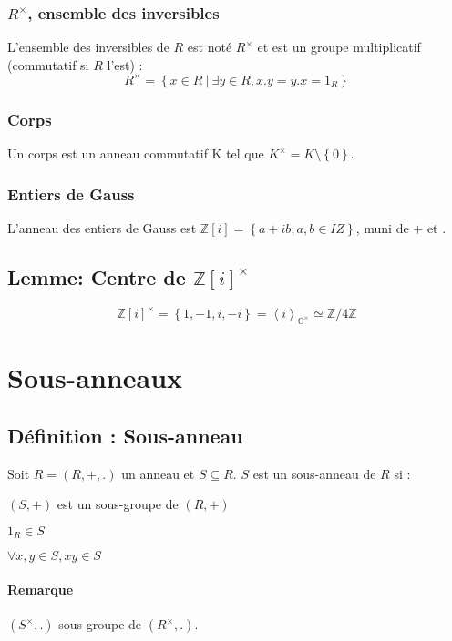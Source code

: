 \documentclass[reqno,a4paper,10pt]{report}
\makeatletter
\newcommand{\gen}[1]{\left\langle #1 \right\rangle} %
\newcommand{\set}[1]{\left\lbrace #1 \right\rbrace} %
\newcommand{\IZ}{\ensuremath{\mathbb{Z}}\xspace} %
\newcommand{\IC}{\ensuremath{\mathbb{C}}\xspace} %
\newcommand{\such}{\ | \ }
\let\olditemize=\itemize%
\renewenvironment{itemize}{%
    \olditemize%
  }{%
    \@noparlisttrue%
    \endlist%
  }%
\makeatother
\begin{document}
\subsubsection{$R^\times$, ensemble des inversibles}
L'ensemble des inversibles de $R$ est noté $R^\times$ et est un groupe
multiplicatif (commutatif si $R$ l'est) :
\[R^\times = \set{x \in R \such \exists y \in R, x.y =y.x = 1_R}\]

\subsubsection{Corps}
Un corps est un anneau commutatif K tel que $K^{\times} = K\setminus\set{0}$.

\subsubsection{Entiers de Gauss}
L'anneau des entiers de Gauss est $\IZ[i]=\set{a+ib; a, b \in IZ}$, muni
de $+$ et $.$

\subsection{Lemme: Centre de ${\IZ[i]}^\times$}
\[{\IZ[i]}^\times = \set{1,-1,i,-i} = \gen{i}_{\IC^\times} \simeq \IZ/4\IZ\]
 \begin{comment}
  preuve 17/09/09 p1
\end{comment}


\section{Sous-anneaux}
\subsection{Définition : Sous-anneau}
Soit $R=(R,+,.)$ un anneau et $S \subseteq R$. $S$ est un sous-anneau de $R$
si :
\begin{itemize}
  \item $(S,+)$ est un sous-groupe de $(R,+)$
  \item $1_R \in S$
  \item $\forall x,y \in S, xy \in S$
\end{itemize}

\paragraph{Remarque} $(S^\times, .)$ sous-groupe de $(R^\times, .)$.
\end{document}
